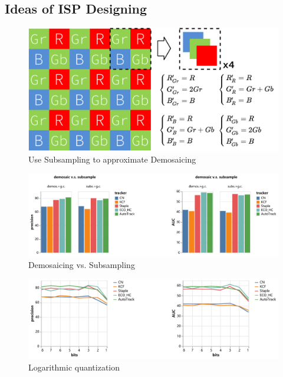 \documentclass{beamer}
\begin{document}
\subsection{Ideas of ISP Designing}

\begin{frame}
    \begin{figure}[htpb]
        \begin{center}
            \includegraphics[width=0.8\linewidth]{fig/isp_dem_1.pdf}
            \caption{Use Subsampling to approximate Demosaicing}
        \end{center}
    \end{figure}
\end{frame}

\begin{frame}
    \begin{figure}[htpb]
        \begin{center}
            \includegraphics[width=0.8\linewidth]{fig/isp_dem_2.pdf}
            \caption{Demosaicing vs. Subsampling}
        \end{center}
    \end{figure}
\end{frame}

\begin{frame}
    \begin{figure}[htpb]
        \begin{center}
            \includegraphics[width=0.8\linewidth]{fig/bits.pdf}
            \caption{Logarithmic quantization}
        \end{center}
    \end{figure}
\end{frame}
\end{document}
